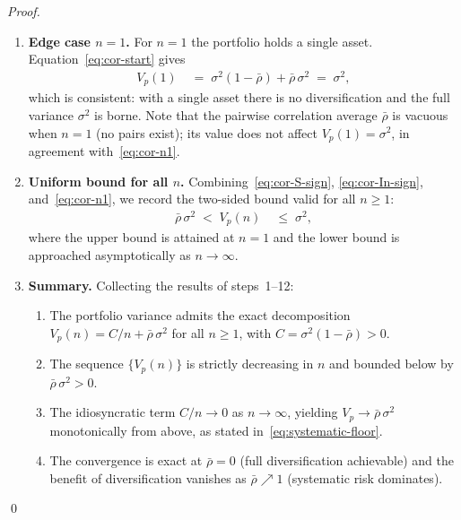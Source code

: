 \documentclass[12pt,openany]{book}
\numberwithin{equation}{chapter}
\theoremstyle{plain}
\theoremstyle{definition}
\theoremstyle{remark}
\begin{document}
\begin{proof}
\begin{enumerate}
  \item \textbf{Edge case $n = 1$.}
        For $n = 1$ the portfolio holds a single asset.
        Equation~\eqref{eq:cor-start} gives
        \begin{align}
          V_p(1)
          &\;=\;
            \sigma^2(1-\bar{\rho})
            + \bar{\rho}\,\sigma^2
          \;=\;
            \sigma^2,
          \label{eq:cor-n1}
        \end{align}
        which is consistent: with a single asset there is no
        diversification and the full variance $\sigma^2$ is borne.
        Note that the pairwise correlation average $\bar{\rho}$ is
        vacuous when $n=1$ (no pairs exist); its value does not
        affect $V_p(1) = \sigma^2$, in agreement
        with~\eqref{eq:cor-n1}.

  \item \textbf{Uniform bound for all $n$.}
        Combining~\eqref{eq:cor-S-sign}, \eqref{eq:cor-In-sign},
        and~\eqref{eq:cor-n1}, we record the two-sided bound valid
        for all $n \geq 1$:
        \begin{align}
          \bar{\rho}\,\sigma^2
          \;<\;
          V_p(n)
          &\;\leq\;
            \sigma^2,
          \label{eq:cor-bounds}
        \end{align}
        where the upper bound is attained at $n = 1$ and the lower
        bound is approached asymptotically as $n \to \infty$.

  \item \textbf{Summary.}
        Collecting the results of steps~1--12:
        \begin{enumerate}
          \item The portfolio variance admits the exact decomposition
                $V_p(n) = C/n + \bar{\rho}\,\sigma^2$ for all
                $n \geq 1$, with $C = \sigma^2(1-\bar{\rho}) > 0$.
          \item The sequence $\{V_p(n)\}$ is strictly decreasing
                in $n$ and bounded below by $\bar{\rho}\,\sigma^2 > 0$.
          \item The idiosyncratic term $C/n \to 0$ as
                $n \to \infty$, yielding
                $V_p \to \bar{\rho}\,\sigma^2$ monotonically
                from above, as stated in~\eqref{eq:systematic-floor}.
          \item The convergence is exact at $\bar{\rho} = 0$
                (full diversification achievable) and the benefit of
                diversification vanishes as $\bar{\rho} \nearrow 1$
                (systematic risk dominates).
        \end{enumerate}
\end{enumerate}
\qed
\end{proof}
\end{document}
